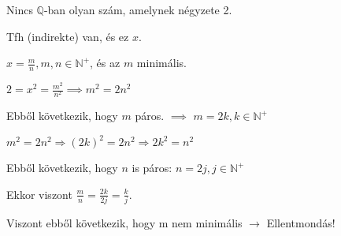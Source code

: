 \begin{frame}
  \begin{tcolorbox}[title={Tétel: $\sqrt{2}$ nem racionális}]
    Nincs $\mathbb{Q}$-ban olyan szám, amelynek négyzete 2.
  \tcblower
    \\
    \mmedskip
    
    Tfh (indirekte) van, és ez $x$.\\
    \msmallskip
    
    $x = \frac{m}{n}, m,n \in \mathbb{N}^+$, és az $m$ minimális.\\
    \msmallskip
    
    $2 = x^2 = \frac{m^2}{n^2} \implies m^2 = 2n^2$\\
    \msmallskip
    
    Ebből következik, hogy $m$ páros. $\implies$ $m = 2k, k \in \mathbb{N}^+$\\
    \msmallskip
    
    $m^2 = 2n^2 \Rightarrow (2k)^2 = 2n^2 \Rightarrow 2k^2 = n^2$\\
    \msmallskip
    
    Ebből következik, hogy $n$ is páros: $n = 2j, j \in \mathbb{N}^+$\\
    \msmallskip
    
    Ekkor viszont $\frac{m}{n} = \frac{2k}{2j} = \frac{k}{j}$.\\
    \msmallskip
    
    Viszont ebből következik, hogy m nem minimális $\rightarrow$ Ellentmondás!
  \end{tcolorbox}
\end{frame}


